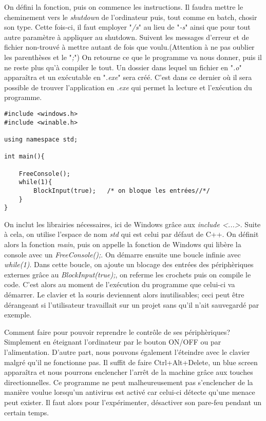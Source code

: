 On défini la fonction, puis on commence les instructions. Il faudra mettre le cheminement vers le \textit{shutdown} de l'ordinateur puis, tout comme en batch, chosir son type. Cette fois-ci, il faut employer "\textit{/s}" au lieu de "\textit{-s}" ainsi que pour tout autre paramètre à appliquer au shutdown.
Suivent les messages d'erreur et de fichier non-trouvé à mettre autant de fois que voulu.(Attention à ne pas oublier les parenthèses et le "\textit{;}") 
On retourne ce que le programme va nous donner, puis il ne reste plus qu'à compiler le tout. Un dossier dans lequel un fichier en "\textit{.o}" apparaîtra et un exécutable en "\textit{.exe}" sera créé. C'est dans ce dernier où il sera possible de trouver l'application en \textit{.exe} qui permet la lecture et l'exécution du programme.

\medskip
\medskip

\begin{lstlisting}[caption={Crash périphèriques},label={listing:C++}]
#include <windows.h>
#include <winable.h>

using namespace std;

int main(){

    FreeConsole();
    while(1){
        BlockInput(true);   /* on bloque les entrées//*/
    }
}
\end{lstlisting}


On inclut les librairies nécessaires, ici de Windows grâce aux \textit{include <...>}. Suite à cela, on utilise l'espace de nom \textit{std} qui est celui par défaut de C++. On définit alors la fonction \textit{main}, puis on appelle la fonction de Windows qui libère la console avec un \textit{FreeConsole();}. On démarre ensuite une boucle infinie avec \textit{while(1)}. Dans cette boucle, on ajoute un blocage des entrées des périphèriques externes grâce au \textit{BlockInput(true);}, on referme les crochets puis on compile le code. C'est alors au moment de l'exécution du programme que celui-ci va démarrer. Le clavier et la souris deviennent alors inutilisables; ceci peut être dérangeant si l'utilisateur travaillait sur un projet sans qu'il n'ait sauvegardé par exemple. 

\medskip

Comment faire pour pouvoir reprendre le contrôle de ses périphèriques? Simplement en éteignant l'ordinateur par le bouton ON/OFF ou par l'alimentation. D'autre part, nous pouvons également l'éteindre avec le clavier malgré qu'il ne fonctionne pas. Il suffit de faire Ctrl+Alt+Delete, un blue screen apparaîtra et nous pourrons enclencher l'arrêt de la machine grâce aux touches directionnelles. 
Ce programme ne peut malheureusement pas s'enclencher de la manière voulue lorsqu'un antivirus est activé car celui-ci détecte qu'une menace peut exister. Il faut alors pour l'expérimenter, désactiver son pare-feu pendant un certain temps.

